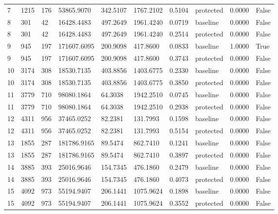 \documentclass[11pt,a4paper]{article}
\begin{document}
\begin{landscape}
{\begin{longtable}{llllllllll}
7 & 1215 & 176 & 53865.9070 & 342.5107 & 1767.2102 & 0.5104 & protected & 0.0000 & False \\
8 & 301 & 42 & 16428.4483 & 497.2649 & 1961.4240 & 0.0719 & baseline & 0.0000 & False \\
8 & 301 & 42 & 16428.4483 & 497.2649 & 1961.4240 & 0.2514 & protected & 0.0000 & False \\
9 & 945 & 197 & 171607.6095 & 200.9098 & 417.8600 & 0.0833 & baseline & 1.0000 & True \\
9 & 945 & 197 & 171607.6095 & 200.9098 & 417.8600 & 0.3743 & protected & 0.0000 & False \\
10 & 3174 & 308 & 18530.7135 & 403.8856 & 1403.6775 & 0.2330 & baseline & 0.0000 & False \\
10 & 3174 & 308 & 18530.7135 & 403.8856 & 1403.6775 & 0.3850 & protected & 0.0000 & False \\
11 & 3779 & 710 & 98080.1864 & 64.3038 & 1942.2510 & 0.0745 & baseline & 0.0000 & False \\
11 & 3779 & 710 & 98080.1864 & 64.3038 & 1942.2510 & 0.2938 & protected & 0.0000 & False \\
12 & 4311 & 956 & 37465.0252 & 82.2381 & 131.7993 & 0.1598 & baseline & 0.0000 & False \\
12 & 4311 & 956 & 37465.0252 & 82.2381 & 131.7993 & 0.5154 & protected & 0.0000 & False \\
13 & 1855 & 287 & 181786.9165 & 89.5474 & 862.7410 & 0.1241 & baseline & 0.0000 & False \\
13 & 1855 & 287 & 181786.9165 & 89.5474 & 862.7410 & 0.3897 & protected & 0.0000 & False \\
14 & 3885 & 393 & 25016.9646 & 154.7345 & 476.1860 & 0.2479 & baseline & 0.0000 & False \\
14 & 3885 & 393 & 25016.9646 & 154.7345 & 476.1860 & 0.4073 & protected & 0.0000 & False \\
15 & 4092 & 973 & 55194.9407 & 206.1441 & 1075.9624 & 0.1898 & baseline & 0.0000 & False \\
15 & 4092 & 973 & 55194.9407 & 206.1441 & 1075.9624 & 0.3552 & protected & 0.0000 & False \\
\end{longtable}

}
\end{landscape}
\end{document}
